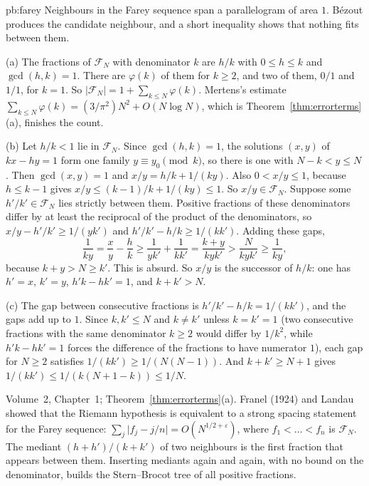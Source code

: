 \begin{solution}{pb:farey}
\idea Neighbours in the Farey sequence span a parallelogram of area $1$. Bézout produces the candidate neighbour, and a short inequality shows that nothing fits between them.

\writeup (a) The fractions of $\mathcal F_N$ with denominator $k$ are $h/k$ with $0\le h\le k$ and $\gcd(h,k)=1$. There are $\varphi(k)$ of them for $k\ge2$, and two of them, $0/1$ and $1/1$, for $k=1$. So $|\mathcal F_N|=1+\sum_{k\le N}\varphi(k)$. Mertens's estimate $\sum_{k\le N}\varphi(k)=(3/\pi^2)N^2+O(N\log N)$, which is Theorem~\ref{thm:errorterms}(a), finishes the count.

(b) Let $h/k<1$ lie in $\mathcal F_N$. Since $\gcd(h,k)=1$, the solutions $(x,y)$ of $kx-hy=1$ form one family $y\equiv y_0\pmod k$, so there is one with $N-k<y\le N$. Then $\gcd(x,y)=1$ and $x/y=h/k+1/(ky)$. Also $0<x/y\le1$, because $h\le k-1$ gives $x/y\le(k-1)/k+1/(ky)\le1$. So $x/y\in\mathcal F_N$. Suppose some $h'/k'\in\mathcal F_N$ lies strictly between them. Positive fractions of these denominators differ by at least the reciprocal of the product of the denominators, so $x/y-h'/k'\ge1/(yk')$ and $h'/k'-h/k\ge1/(kk')$. Adding these gaps,
\[
\frac1{ky}=\frac xy-\frac hk\ge\frac1{yk'}+\frac1{kk'}=\frac{k+y}{kyk'}>\frac N{kyk'}\ge\frac1{ky},
\]
because $k+y>N\ge k'$. This is absurd. So $x/y$ is the successor of $h/k$: one has $h'=x$, $k'=y$, $h'k-hk'=1$, and $k+k'>N$.

(c) The gap between consecutive fractions is $h'/k'-h/k=1/(kk')$, and the gaps add up to $1$. Since $k,k'\le N$ and $k\ne k'$ unless $k=k'=1$ (two consecutive fractions with the same denominator $k\ge2$ would differ by $1/k^2$, while $h'k-hk'=1$ forces the difference of the fractions to have numerator $1$), each gap for $N\ge2$ satisfies $1/(kk')\ge1/(N(N-1))$. And $k+k'\ge N+1$ gives $1/(kk')\le1/(k(N+1-k))\le1/N$.

\tools Volume~2, Chapter~1; Theorem~\ref{thm:errorterms}(a).
\leads Franel (1924) and Landau showed that the Riemann hypothesis is equivalent to a strong spacing statement for the Farey sequence: $\sum_j\bigl|f_j-j/n\bigr|=O(N^{1/2+\varepsilon})$, where $f_1<\dots<f_n$ is $\mathcal F_N$. The mediant $(h+h')/(k+k')$ of two neighbours is the first fraction that appears between them. Inserting mediants again and again, with no bound on the denominator, builds the Stern--Brocot tree of all positive fractions.
\end{solution}

